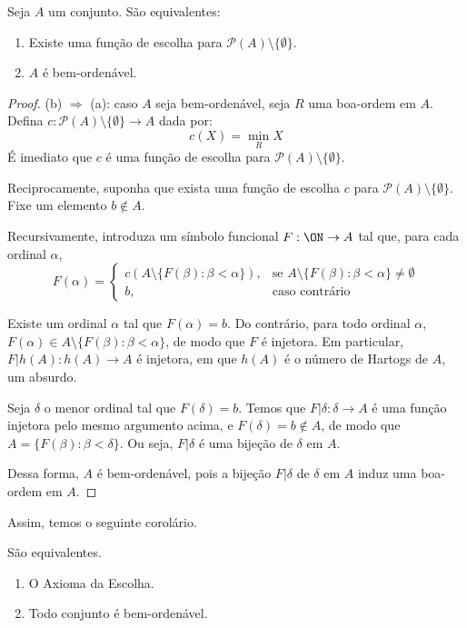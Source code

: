 \begin{proposition}[$ZF^-$]\label{prop:funcaoEscolhaImplicaBoaOrdem}
    Seja $A$ um conjunto.
    São equivalentes:
    \begin{enumerate}[label=(\alph*)]
        \item Existe uma função de escolha para $\mathcal P(A)\setminus\{\emptyset\}$.
        \item $A$ é bem-ordenável.
    \end{enumerate}
\end{proposition}
\begin{proof}
    (b) $\Rightarrow$ (a): caso $A$ seja bem-ordenável, seja $R$ uma boa-ordem em $A$.
    Defina $c:\mathcal P(A)\setminus\{\emptyset\}\to A$ dada por:
    \[
        c(X) = \min_R X
    \]
    É imediato que $c$ é uma função de escolha para $\mathcal P(A)\setminus\{\emptyset\}$.

    Reciprocamente, suponha que exista uma função de escolha $c$ para $\mathcal P(A)\setminus\{\emptyset\}$.
    Fixe um elemento $b \notin A$.

    Recursivamente, introduza um símbolo funcional $F:\ON \to A$ tal que, para cada ordinal $\alpha$,
    \[
        F(\alpha)=\begin{cases}
        c\left(A\setminus \{F(\beta): \beta<\alpha\}\right), & \text{se } A\setminus \{F(\beta): \beta<\alpha\}\neq \emptyset\\
        b, & \text{caso contrário}
        \end{cases}
    \]

    Existe um ordinal $\alpha$ tal que $F(\alpha)=b$.
    Do contrário, para todo ordinal $\alpha$, $F(\alpha)\in A\setminus\{F(\beta): \beta<\alpha\}$, de modo que $F$ é injetora.
    Em particular, $F|h(A): h(A)\to A$ é injetora, em que $h(A)$ é o número de Hartogs de $A$, um absurdo.

    Seja $\delta$ o menor ordinal tal que $F(\delta)=b$.
    Temos que $F| \delta: \delta \to A$ é uma função injetora pelo mesmo argumento acima, e $F(\delta)=b\notin A$, de modo que $A=\{F(\beta): \beta<\delta\}$.
    Ou seja, $F|\delta$ é uma bijeção de $\delta$ em $A$.

    Dessa forma, $A$ é bem-ordenável, pois a bijeção $F|\delta$ de $\delta$ em $A$ induz uma boa-ordem em $A$.
\end{proof}


Assim, temos o seguinte corolário.
\begin{corollary}[$ZF^-$]\label{cor:equivalenciaFuncaoEscolhaBoaOrdem}
    São equivalentes.
    \begin{enumerate}[label=(\alph*)]
        \item O Axioma da Escolha.
        \item Todo conjunto é bem-ordenável.
    \end{enumerate}
\end{corollary}


